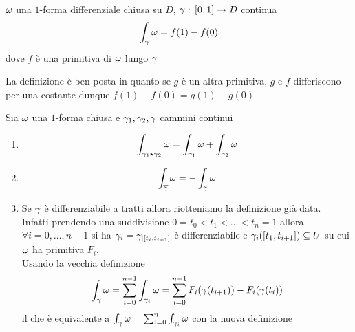 \begin{defn}$\omega$ una $1$-forma differenziale chiusa su $D$, $\gamma:\, [0,1]\to D$ continua
$$\int_\gamma \omega = f(1) - f(0)$$
dove $f$ \`e una primitiva di $\omega$ lungo $\gamma$
\begin{oss}La definizione \`e ben posta in quanto se $g$ \`e un altra primitiva, $g$ e $f$ differiscono per una costante dunque $f(1)-f(0)=g(1) - g(0)$
\end{oss}
\end{defn}
\begin{fatti}Sia $\omega$ una $1$-forma chiusa e $\gamma_1, \gamma_2, \gamma$ cammini continui
\begin{enumerate}
\item 
$$\int_{\gamma_1\star \gamma_2} \omega = \int_{\gamma_1} \omega + \int_{\gamma_2} \omega$$
\item $$\int_{\overline{\gamma}}\omega=-\int_{\gamma}\omega$$
\item Se $\gamma$ \`e differenziabile a tratti allora riotteniamo la definizione gi\`a data.\\
Infatti prendendo una suddivisione $0=t_0< t_1< \dots <t_n=1$ allora $\forall i=0, \dots , n-1$  si ha $\gamma_i =\gamma_{\vert [t_i,t_{i+1}]}$ \`e differenziabile e $\gamma_i([t_1, t_{i+1}]) \subseteq U$ su cui $\omega$ ha primitiva $F_i$.\\
Usando la vecchia definizione
$$\int_\gamma \omega = \sum_{i=0}^{n-1} \int_{\gamma_i} \omega = \sum_{i=0}^{n-1} F_i(\gamma(t_{i+1})) - F_i(\gamma(t_{i})) $$ 
il che \`e equivalente a $\int_\gamma \omega =\sum_{i=0}^n \int_{\gamma_i} \omega$ con la nuova definizione 
\end{enumerate}
\end{fatti}
